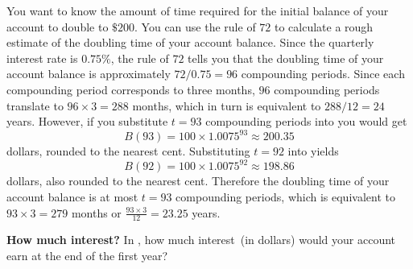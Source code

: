 \documentclass[a4paper,oneside,12pt]{article}
\begin{document}
\begin{solution}
You want to know the amount of time required for the initial balance
of your account to double to $\$200$.  You can use the rule of $72$ to
calculate a rough estimate of the doubling time of your account
balance.  Since the quarterly interest rate is $0.75\%$, the rule of
$72$ tells you that the doubling time of your account balance is
approximately $72 / 0.75 = 96$ compounding periods.  Since each
compounding period corresponds to three months, $96$ compounding
periods translate to $96 \times 3 = 288$ months, which in turn is
equivalent to $288 / 12 = 24$ years.  However, if you substitute
$t = 93$ compounding periods into
 you would get
\[
B(93)
=
100 \times 1.0075^{93}
\approx
200.35
\]
dollars, rounded to the nearest cent.  Substituting $t = 92$ into
 yields
\[
B(92)
=
100 \times 1.0075^{92}
\approx
198.86
\]
dollars, also rounded to the nearest cent.  Therefore the doubling
time of your account balance is at most $t = 93$ compounding periods,
which is equivalent to $93 \times 3 = 279$ months or
$\frac{93 \times 3}{12} = 23.25$ years.
\end{solution}

\begin{exercise}
\textbf{How much interest?}
In , how much interest~(in
dollars) would your account earn at the end of the first year?
\end{exercise}

\end{document}
